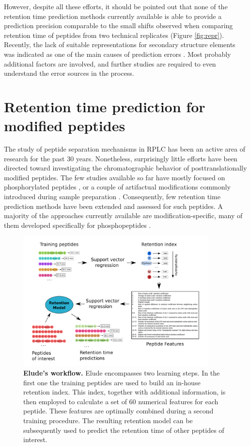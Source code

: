 \documentclass[a4paper]{article}
\begin{document}
However, despite all these efforts, it should be pointed out that none
of the retention time prediction methods currently available is able
to provide a prediction precision comparable to the small shifts
observed when comparing retention time of peptides from two technical
replicates (Figure \ref{fig:repr}). Recently, the lack of suitable
representations for secondary structure elements was indicated as one
of the main causes of prediction errors \cite{Reimer2012}.  Most
probably additional factors are involved, and further studies are
required to even understand the error sources in the process.

\section{\label{sec:rtpredm}Retention time prediction for modified peptides}

The study of peptide separation mechanisms in RPLC has been an active
area of research for the past 30 years. Nonetheless, surprisingly
little efforts have been directed toward investigating the
chromatographic behavior of posttranslationally modified peptides. The
few studies available so far have mostly focused on phosphorylated
peptides \cite{Kim2007}, or a couple of artifactual modifications
commonly introduced during sample preparation
\cite{Reimer2011}. Consequently, few retention time prediction methods
have been extended and assessed for such peptides. A majority of the
approaches currently available are modification-specific, many of them
developed specifically for phosphopeptides \cite{Kawakami2005,
  perlova2010}.

\begin{figure}[!h]
\centering 
\includegraphics[width=0.9\textwidth]{img/elude-ptm.pdf}
\caption{\label{fig:elude} {\bf {\sc Elude}'s workflow.}  {\sc Elude} encompasses two learning steps. In the first one the training peptides are used to build an in-house retention index. This index, together with additional information, is then employed to calculate a set of 60 numerical features for each peptide. These features are optimally combined during a second training procedure. The resulting retention model can be subsequently used to predict the retention time of other peptides of interest.}
\end{figure}
\end{document}
